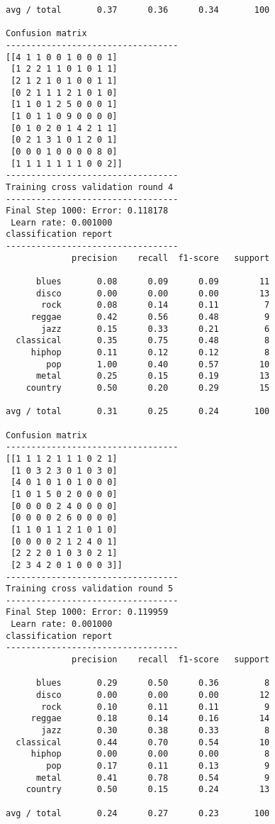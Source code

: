 \documentclass{article}
\begin{document}
\begin{Verbatim}[commandchars=\\\{\}]
avg / total       0.37      0.36      0.34       100

Confusion matrix
----------------------------------
[[4 1 1 0 0 1 0 0 0 1]
 [1 2 2 1 1 0 1 0 1 1]
 [2 1 2 1 0 1 0 0 1 1]
 [0 2 1 1 1 2 1 0 1 0]
 [1 1 0 1 2 5 0 0 0 1]
 [1 0 1 1 0 9 0 0 0 0]
 [0 1 0 2 0 1 4 2 1 1]
 [0 2 1 3 1 0 1 2 0 1]
 [0 0 0 1 0 0 0 0 8 0]
 [1 1 1 1 1 1 1 0 0 2]]
----------------------------------
Training cross validation round 4
----------------------------------
Final Step 1000: Error: 0.118178 
 Learn rate: 0.001000
classification report 
----------------------------------
             precision    recall  f1-score   support

      blues       0.08      0.09      0.09        11
      disco       0.00      0.00      0.00        13
       rock       0.08      0.14      0.11         7
     reggae       0.42      0.56      0.48         9
       jazz       0.15      0.33      0.21         6
  classical       0.35      0.75      0.48         8
     hiphop       0.11      0.12      0.12         8
        pop       1.00      0.40      0.57        10
      metal       0.25      0.15      0.19        13
    country       0.50      0.20      0.29        15

avg / total       0.31      0.25      0.24       100

Confusion matrix
----------------------------------
[[1 1 1 2 1 1 1 0 2 1]
 [1 0 3 2 3 0 1 0 3 0]
 [4 0 1 0 1 0 1 0 0 0]
 [1 0 1 5 0 2 0 0 0 0]
 [0 0 0 0 2 4 0 0 0 0]
 [0 0 0 0 2 6 0 0 0 0]
 [1 1 0 1 1 2 1 0 1 0]
 [0 0 0 0 2 1 2 4 0 1]
 [2 2 2 0 1 0 3 0 2 1]
 [2 3 4 2 0 1 0 0 0 3]]
----------------------------------
Training cross validation round 5
----------------------------------
Final Step 1000: Error: 0.119959 
 Learn rate: 0.001000
classification report 
----------------------------------
             precision    recall  f1-score   support

      blues       0.29      0.50      0.36         8
      disco       0.00      0.00      0.00        12
       rock       0.10      0.11      0.11         9
     reggae       0.18      0.14      0.16        14
       jazz       0.30      0.38      0.33         8
  classical       0.44      0.70      0.54        10
     hiphop       0.00      0.00      0.00         8
        pop       0.17      0.11      0.13         9
      metal       0.41      0.78      0.54         9
    country       0.50      0.15      0.24        13

avg / total       0.24      0.27      0.23       100


\end{Verbatim}
\end{document}
